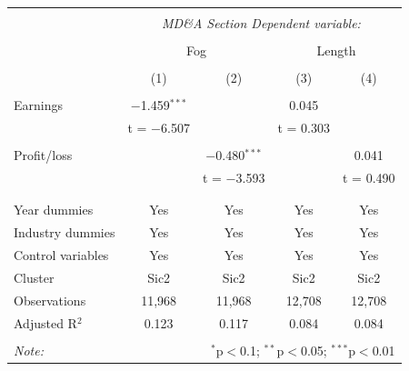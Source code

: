 \documentclass[a4paper]{article}
\begin{document}
\begin{center}
\begin{longtable}{@{\extracolsep{5pt}}lcccc} 
\\[-1.8ex]\hline 
\hline \\[-1.8ex] 
 & \multicolumn{4}{c}{\textit{MD\&A Section Dependent variable:}} \\ 
\cline{2-5} 
\\[-1.8ex] & \multicolumn{2}{c}{Fog} & \multicolumn{2}{c}{Length} \\ 
\\[-1.8ex] & (1) & (2) & (3) & (4)\\ 
\hline \\[-1.8ex] 
 Earnings & $-$1.459$^{***}$ &  & 0.045 &  \\ 
  & t = $-$6.507 &  & t = 0.303 &  \\ 
  & & & & \\ 
 Profit/loss &  & $-$0.480$^{***}$ &  & 0.041 \\ 
  &  & t = $-$3.593 &  & t = 0.490 \\ 
  & & & & \\ 
\hline \\[-1.8ex] 
Year dummies & Yes & Yes & Yes & Yes \\ 
Industry dummies & Yes & Yes & Yes & Yes \\ 
Control variables & Yes & Yes & Yes & Yes \\ 
Cluster & Sic2 & Sic2 & Sic2 & Sic2 \\ 
Observations & 11,968 & 11,968 & 12,708 & 12,708 \\ 
Adjusted R$^{2}$ & 0.123 & 0.117 & 0.084 & 0.084 \\ 
\hline 
\hline \\[-1.8ex] 
\textit{Note:}  & \multicolumn{4}{r}{$^{*}$p$<$0.1; $^{**}$p$<$0.05; $^{***}$p$<$0.01} \\ 
\end{longtable}
\end{center}
 
\end{document}
